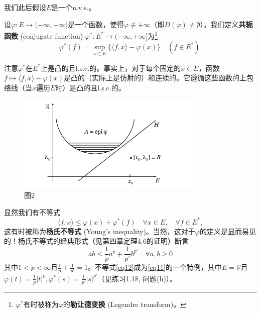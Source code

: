 我们此后假设$E$是一个n.v.s.。
\begin{definition}
设$\varphi: E \to (-\infty, +\infty]$是一个函数，使得$\varphi \not\equiv +\infty$（即$D(\varphi) \neq \emptyset$）。我们定义\textbf{共轭函数} (conjugate function) $\varphi^*: E^* \to (-\infty, +\infty]$为\footnote{$\varphi^*$有时被称为$\varphi$的\textbf{勒让德变换} (Legendre transform)。}
\[ \varphi^*(f) = \sup_{x \in E} \{\langle f, x \rangle - \varphi(x)\} \quad (f \in E^*). \]
\end{definition}
注意$\varphi^*$在$E^*$上是凸的且l.s.c.的。事实上，对于每个固定的$x \in E$，函数$f \mapsto \langle f, x \rangle - \varphi(x)$是凸的（实际上是仿射的）和连续的。它遵循这些函数的上包络线（当$x$遍历$E$时）是凸的且l.s.c.的。

\begin{figure}[H]
    \centering
    \includegraphics[width=0.8\textwidth]{image/fig2.png}
    \caption{图2}
    \label{fig:2}
\end{figure}

\begin{remark}
显然我们有不等式
\begin{equation}\label{eq11}
\langle f, x \rangle \leq \varphi(x) + \varphi^*(f) \quad \forall x \in E, \quad \forall f \in E^*,
\end{equation}
这有时被称为\textbf{杨氏不等式} (Young's inequality)。当然，这对于$\varphi$的定义是显而易见的！杨氏不等式的经典形式（见第四章定理4.6的证明）断言
\begin{equation}\label{eq12}
ab \leq \frac{1}{p}a^p + \frac{1}{p'}b^{p'} \quad \forall a, b \geq 0
\end{equation}
其中$1 < p < \infty$且$\frac{1}{p}+\frac{1}{p'}=1$。不等式\eqref{eq12}成为\eqref{eq11}的一个特例，其中$E=\mathbb{R}$且$\varphi(t)=\frac{1}{p}|t|^p, \varphi^*(s) = \frac{1}{p'}|s|^{p'}$（见练习1.18, 问题(h)）。
\end{remark}

